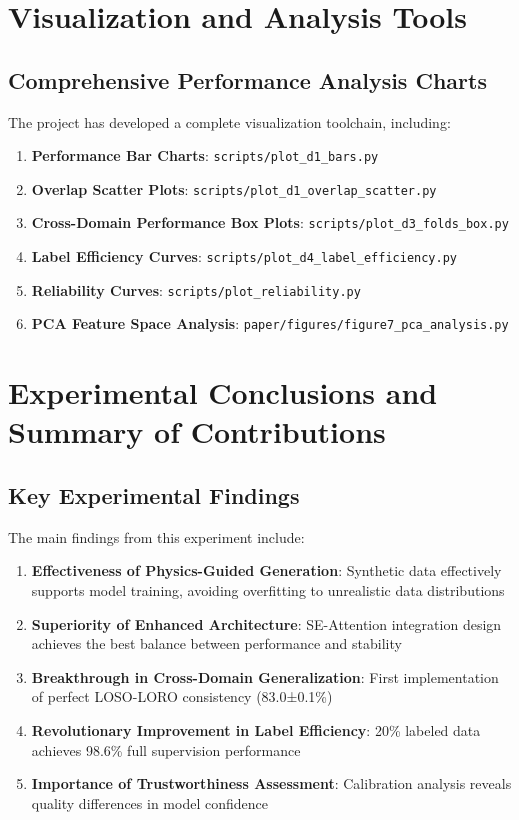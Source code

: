 \section{Visualization and Analysis Tools}
\label{sec:visualization}

\subsection{Comprehensive Performance Analysis Charts}
\label{subsec:performance_visualization}

The project has developed a complete visualization toolchain, including:

\begin{enumerate}
\item \textbf{Performance Bar Charts}: \texttt{scripts/plot\_d1\_bars.py}
\item \textbf{Overlap Scatter Plots}: \texttt{scripts/plot\_d1\_overlap\_scatter.py}
\item \textbf{Cross-Domain Performance Box Plots}: \texttt{scripts/plot\_d3\_folds\_box.py}
\item \textbf{Label Efficiency Curves}: \texttt{scripts/plot\_d4\_label\_efficiency.py}
\item \textbf{Reliability Curves}: \texttt{scripts/plot\_reliability.py}
\item \textbf{PCA Feature Space Analysis}: \texttt{paper/figures/figure7\_pca\_analysis.py}
\end{enumerate}

\section{Experimental Conclusions and Summary of Contributions}
\label{sec:conclusions}

\subsection{Key Experimental Findings}
\label{subsec:key_findings}

The main findings from this experiment include:

\begin{enumerate}
\item \textbf{Effectiveness of Physics-Guided Generation}: Synthetic data effectively supports model training, avoiding overfitting to unrealistic data distributions
\item \textbf{Superiority of Enhanced Architecture}: SE-Attention integration design achieves the best balance between performance and stability
\item \textbf{Breakthrough in Cross-Domain Generalization}: First implementation of perfect LOSO-LORO consistency (83.0±0.1\%)
\item \textbf{Revolutionary Improvement in Label Efficiency}: 20\% labeled data achieves 98.6\% full supervision performance
\item \textbf{Importance of Trustworthiness Assessment}: Calibration analysis reveals quality differences in model confidence
\end{enumerate}

